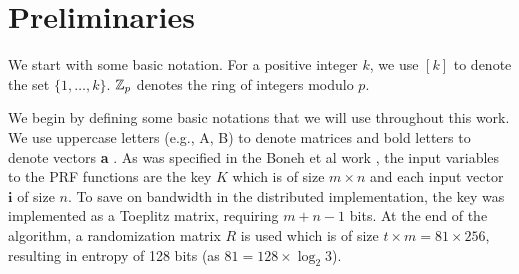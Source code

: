 
\section{Preliminaries}
\label{sec:preliminaries}

We start with some basic notation. For a positive integer $k$, we use $[k]$ to denote the set $\{1,\dots, k\}$. $\mathbb{Z}_p$ denotes the ring of integers modulo $p$. 





We begin by defining some basic notations that we will use throughout this work. We use uppercase letters (e.g.,
A, B) to denote matrices and bold letters to denote vectors \textbf{a} . As was specified in the Boneh et al work \cite{boneh2018-darkmatter}, the input variables to the PRF functions are the key ${K}$ which is of size $m \times n$ and each input vector $\textbf{i}$ of size $n$. 
To save on bandwidth in the distributed implementation, the key was implemented as a Toeplitz matrix, requiring $m + n - 1$ bits.
At the end of the algorithm, a randomization matrix $R$ is used which is of size $t \times m = 81 \times 256$, resulting in entropy of 128 bits (as $81 = 128 \times \log_2 3$).
